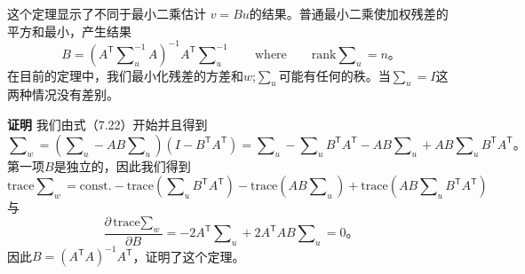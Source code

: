 这个定理显示了不同于最小二乘估计 $v = Bu$的结果。普通最小二乘使加权残差的平方和最小，产生结果
\begin{equation*}
	B = (A^\mathsf{T}\sum\nolimits_{u}^{-1}A)^{-1}A^\mathsf{T}\sum\nolimits_{u}^{-1} \qquad \text{where} \qquad \text{rank} \sum\nolimits_u = n\text{。}
\end{equation*}
在目前的定理中，我们最小化残差的方差和$w$;$\sum_u$可能有任何的秩。当$\sum_u = I$这两种情况没有差别。
\par\noindent
\textbf{证明} 我们由式（7.22）开始并且得到
\begin{equation*}
	\sum\nolimits_w = (\sum\nolimits_u - AB\sum\nolimits_u)(I - B^\mathsf{T}A^\mathsf{T})
	= \sum\nolimits_u - \sum\nolimits_uB^\mathsf{T}A^\mathsf{T} - AB\sum\nolimits_u + AB\sum\nolimits_uB^\mathsf{T}A^\mathsf{T}\text{。}
\end{equation*}
第一项$B$是独立的，因此我们得到
\begin{equation*}
	\text{trace} \sum\nolimits_w = \text{const}.
	- \text{trace}(\sum\nolimits_uB^\mathsf{T}A^\mathsf{T})
	- \text{trace}(AB\sum\nolimits_u)
	+ \text{trace}(AB\sum\nolimits_uB^\mathsf{T}A^\mathsf{T})
\end{equation*}
与
\begin{equation*}
	\frac{\partial {\text{trace} \sum\nolimits_w}}{\partial{B}}
	= -2A^\mathsf{T}\sum\nolimits_u + 2A^\mathsf{T}AB\sum\nolimits_u = 0\text{。}
\end{equation*}
因此$B = (A^\mathsf{T}A)^{-1}A^\mathsf{T}$，证明了这个定理。